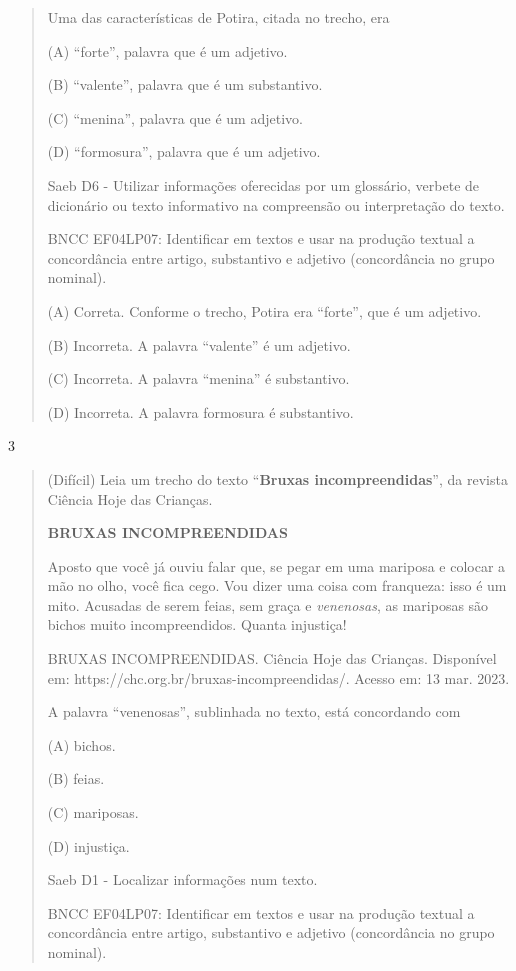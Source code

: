\begin{itemize}
{{{\begin{itemize}
\begin{itemize}
\begin{itemize}
\begin{quote}
Uma das características de Potira, citada no trecho, era

(A) ``forte'', palavra que é um adjetivo.

(B) ``valente'', palavra que é um substantivo.

(C) ``menina'', palavra que é um adjetivo.

(D) ``formosura'', palavra que é um adjetivo.

Saeb D6 - Utilizar informações oferecidas por um glossário, verbete de
dicionário ou texto informativo na compreensão ou interpretação do
texto.

BNCC EF04LP07: Identificar em textos e usar na produção textual a
concordância entre artigo, substantivo e adjetivo (concordância no grupo
nominal).

(A) Correta. Conforme o trecho, Potira era ``forte'', que é um adjetivo.

(B) Incorreta. A palavra ``valente'' é um adjetivo.

(C) Incorreta. A palavra ``menina'' é substantivo.

(D) Incorreta. A palavra formosura é substantivo.
\end{quote}

\num{3}

\begin{quote}
(Difícil) Leia um trecho do texto ``\textbf{Bruxas incompreendidas}'',
da revista Ciência Hoje das Crianças.

\protect\hypertarget{_Hlk129599092}{}{}\textbf{BRUXAS INCOMPREENDIDAS}

Aposto que você já ouviu falar que, se pegar em uma mariposa e colocar a
mão no olho, você fica cego. Vou dizer uma coisa com franqueza: isso é
um mito. Acusadas de serem feias, sem graça e \emph{venenosas}, as
mariposas são bichos muito incompreendidos. Quanta injustiça!

BRUXAS INCOMPREENDIDAS. Ciência Hoje das Crianças. Disponível em:
https://chc.org.br/bruxas-incompreendidas/. Acesso em: 13 mar. 2023.

A palavra ``venenosas'', sublinhada no texto, está concordando com

(A) bichos.

(B) feias.

(C) mariposas.

(D) injustiça.

Saeb D1 - Localizar informações num texto.

BNCC EF04LP07: Identificar em textos e usar na produção textual a
concordância entre artigo, substantivo e adjetivo (concordância no grupo
nominal).


\end{quote}
\end{itemize}
\end{itemize}
\end{itemize}}}}
\end{itemize}
